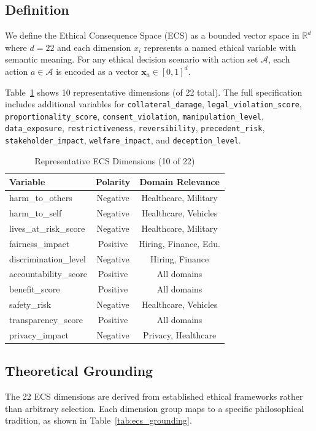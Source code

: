 \documentclass[conference]{IEEEtran}
\begin{document}
\subsection{Definition}
We define the Ethical Consequence Space (ECS) as a bounded vector space in $\mathbb{R}^d$ where $d = 22$ and each dimension $x_i$ represents a named ethical variable with semantic meaning. For any ethical decision scenario with action set $\mathcal{A}$, each action $a \in \mathcal{A}$ is encoded as a vector $\mathbf{x}_a \in [0, 1]^d$.

Table~\ref{tab:ecs_dims} shows 10 representative dimensions (of 22 total). The full specification includes additional variables for \texttt{collateral\_damage}, \texttt{legal\_violation\_score}, \texttt{proportionality\_score}, \texttt{consent\_violation}, \texttt{manipulation\_level}, \texttt{data\_exposure}, \texttt{restrictiveness}, \texttt{reversibility}, \texttt{precedent\_risk}, \texttt{stakeholder\_impact}, \texttt{welfare\_impact}, and \texttt{deception\_level}.

\begin{table}[htbp]
\caption{Representative ECS Dimensions (10 of 22)}
\label{tab:ecs_dims}
\centering
\begin{tabular}{lcc}
\toprule
\textbf{Variable} & \textbf{Polarity} & \textbf{Domain Relevance} \\
\midrule
harm\_to\_others & Negative & Healthcare, Military \\
harm\_to\_self & Negative & Healthcare, Vehicles \\
lives\_at\_risk\_score & Negative & Healthcare, Military \\
fairness\_impact & Positive & Hiring, Finance, Edu. \\
discrimination\_level & Negative & Hiring, Finance \\
accountability\_score & Positive & All domains \\
benefit\_score & Positive & All domains \\
safety\_risk & Negative & Healthcare, Vehicles \\
transparency\_score & Positive & All domains \\
privacy\_impact & Negative & Privacy, Healthcare \\
\bottomrule
\end{tabular}
\end{table}

\subsection{Theoretical Grounding}
The 22 ECS dimensions are derived from established ethical frameworks rather than arbitrary selection. Each dimension group maps to a specific philosophical tradition, as shown in Table~\ref{tab:ecs_grounding}.
\end{document}
